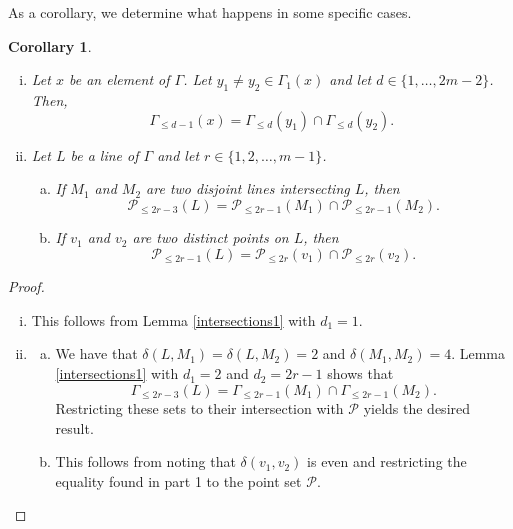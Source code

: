 \documentclass[12pt]{article}
\newcommand{\Points}{\mathcal{P}}
\newtheorem{corollary}{Corollary}
\theoremstyle{remark}
\begin{document}
As a corollary, we determine what happens in some specific cases.
\begin{corollary}\label{intersections2}
\begin{enumerate}[(i)]
\item 	Let \(x\) be an element of $\Gamma$. Let \(y_1\neq y_2 \in \Gamma_1(x)\) and let \(d\in\{1,\dots,2m-2\}\).
	Then,
	\[\Gamma_{\le d - 1}(x) = \Gamma_{\le d}(y_1)\cap\Gamma_{\le d}(y_2).\]

\item  Let \(L\) be a line of \(\Gamma\) and let \(r\in \{1,2,\dots,m-1\}\).
	\begin{enumerate}[(a)]
		\item If 
		\(M_1\) and \(M_2\) are two disjoint lines intersecting \(L\),
		then
		\[\Points_{\le 2r-3}(L) = \Points_{\le 2r-1}(M_1)\cap\Points_{\le 2r-1}(M_2).\]
		\item If
		\(v_1\) and \(v_2\) are two distinct points on \(L\), then
		\[\Points_{\le 2r-1}(L) = \Points_{\le 2r}(v_1)\cap\Points_{\le 2r}(v_2).\]
	\end{enumerate}
\end{enumerate}
\end{corollary}
\begin{proof}
\begin{enumerate}[(i)]
\item 	This follows from Lemma \ref{intersections1} with \(d_1 = 1\).
\item \begin{enumerate}[(a)]\item We have that $\delta(L,M_1)=\delta(L,M_2)=2$ and $\delta(M_1,M_2)=4$. Lemma \ref{intersections1} with $d_1=2$ and  $d_2=2r-1$ shows that $$\Gamma_{\leq 2r-3 }(L)=\Gamma_{\leq 2r-1}(M_1)\cap \Gamma_{\leq 2r-1}(M_2).$$
Restricting these sets to their intersection with $\mathcal{P}$ yields the desired result.
\item This follows from noting that $\delta(v_1,v_2)$ is even and restricting the equality found in part 1 to the point set $\Points$.
\end{enumerate}
\end{enumerate}
\end{proof}


\end{document}
